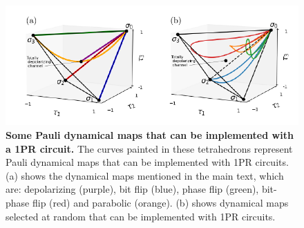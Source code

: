 \documentclass[10pt,letterpaper]{article} %
\begin{document}
\begin{figure} %
\centering
\includegraphics{fig-curves.pdf}
\caption{{\bf Some Pauli dynamical maps that can be implemented with a 1PR circuit.}
The curves painted in these tetrahedrons
represent Pauli dynamical maps that can be implemented with 1PR circuits.
(a) shows the dynamical maps mentioned in the main 
text, which are: depolarizing (purple), bit flip (blue),
phase flip (green), bit-phase flip (red)
and parabolic (orange).
(b) shows dynamical maps selected at random that can be implemented with 1PR 
circuits.}
\label{Fig5}
\end{figure} %
\end{document}
